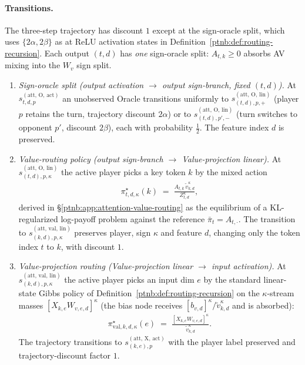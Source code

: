 \paragraph{Transitions.} The three-step trajectory has discount $1$ except at the sign-oracle split,
which uses $\{2\alpha, 2\beta\}$ as at ReLU activation states in
Definition~\ref{ptnb:def:routing-recursion}. Each output $(t,d)$ has \emph{one} sign-oracle split:
$A_{t,k} \ge 0$ absorbs AV mixing into the $W_v$ sign split.
\begin{enumerate}
    \item \emph{Sign-oracle split (output activation $\to$ output sign-branch, fixed $(t,d)$).} At
        $s_{t,d,p}^{(\mathrm{att},\,\mathrm{O},\,\mathrm{act})}$ an unobserved Oracle transitions uniformly
        to $s_{(t,d),p,+}^{(\mathrm{att},\,\mathrm{O},\,\mathrm{lin})}$ (player $p$ retains the turn,
        trajectory discount $2\alpha$) or to $s_{(t,d),p',-}^{(\mathrm{att},\,\mathrm{O},\,\mathrm{lin})}$
        (turn switches to opponent $p'$, discount $2\beta$), each with probability $\tfrac12$. The feature
        index $d$ is preserved.
    \item \emph{Value-routing policy (output sign-branch $\to$ Value-projection linear).} At
        $s_{(t,d),p,\kappa}^{(\mathrm{att},\,\mathrm{O},\,\mathrm{lin})}$ the active player picks a key
        token $k$ by the mixed action
        \begin{align}\label{ptnb:eq:attn-V-routing-policy-O}
            \pi_{t,d,\kappa}^\star(k)
            \;=\; \frac{A_{t,k}\, \tilde{v}_{k,d}^\kappa}{Z_{t,d}^\kappa},
        \end{align}
        derived in \S\ref{ptnb:app:attention-value-routing} as the equilibrium of a KL-regularized log-payoff
        problem against the reference $\bar\pi_t = A_{t,\cdot}$. The transition to
        $s_{(k,d),p,\kappa}^{(\mathrm{att},\,\mathrm{val},\,\mathrm{lin})}$ preserves player,
        sign $\kappa$ and feature $d$, changing only the token index $t$ to $k$, with discount $1$.
    \item \emph{Value-projection routing (Value-projection linear $\to$ input activation).} At
        $s_{(k,d),p,\kappa}^{(\mathrm{att},\,\mathrm{val},\,\mathrm{lin})}$ the active player picks an
        input dim $e$ by the standard linear-state Gibbs policy of Definition~\ref{ptnb:def:routing-recursion}
        on the $\kappa$-stream masses $[X_{k,e}W_{v,e,d}]^\kappa$ (the bias node receives
        $[b_{v,d}]^\kappa/\tilde{v}_{k,d}^\kappa$ and is absorbed):
        \begin{align}\label{ptnb:eq:attn-V-routing-policy}
            \pi_{\mathrm{val},k,d,\kappa}^\star(e)
            \;=\; \frac{[X_{k,e} W_{v,e,d}]^\kappa}{\tilde{v}_{k,d}^\kappa}.
        \end{align}
        The trajectory transitions to $s_{(k,e),p}^{(\mathrm{att},\,\mathrm{X},\,\mathrm{act})}$ with the
        player label preserved and trajectory-discount factor $1$.
\end{enumerate}
